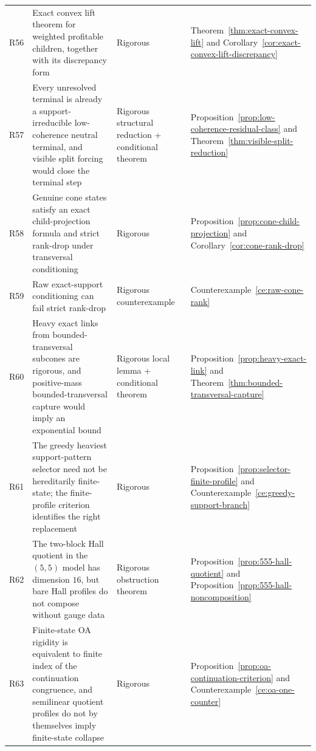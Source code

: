 \documentclass[11pt]{article}
\theoremstyle{definition}
\newcommand{\1}{\mathbf{1}}
\begin{document}
\begin{longtable}{p{}p{}p{}p{}}
R56 & Exact convex lift theorem for weighted profitable children, together with its discrepancy form & Rigorous & Theorem~\ref{thm:exact-convex-lift} and Corollary~\ref{cor:exact-convex-lift-discrepancy}\\
R57 & Every unresolved terminal is already a support-irreducible low-coherence neutral terminal, and visible split forcing would close the terminal step & Rigorous structural reduction + conditional theorem & Proposition~\ref{prop:low-coherence-residual-class} and Theorem~\ref{thm:visible-split-reduction}\\
R58 & Genuine cone states satisfy an exact child-projection formula and strict rank-drop under transversal conditioning & Rigorous & Proposition~\ref{prop:cone-child-projection} and Corollary~\ref{cor:cone-rank-drop}\\
R59 & Raw exact-support conditioning can fail strict rank-drop & Rigorous counterexample & Counterexample~\ref{ce:raw-cone-rank}\\
R60 & Heavy exact links from bounded-transversal subcones are rigorous, and positive-mass bounded-transversal capture would imply an exponential bound & Rigorous local lemma + conditional theorem & Proposition~\ref{prop:heavy-exact-link} and Theorem~\ref{thm:bounded-transversal-capture}\\
R61 & The greedy heaviest support-pattern selector need not be hereditarily finite-state; the finite-profile criterion identifies the right replacement & Rigorous & Proposition~\ref{prop:selector-finite-profile} and Counterexample~\ref{ce:greedy-support-branch}\\
R62 & The two-block Hall quotient in the $(5,5)$ model has dimension $16$, but bare Hall profiles do not compose without gauge data & Rigorous obstruction theorem & Proposition~\ref{prop:555-hall-quotient} and Proposition~\ref{prop:555-hall-noncomposition}\\
R63 & Finite-state OA rigidity is equivalent to finite index of the continuation congruence, and semilinear quotient profiles do not by themselves imply finite-state collapse & Rigorous & Proposition~\ref{prop:oa-continuation-criterion} and Counterexample~\ref{ce:oa-one-counter}\\


\end{longtable}
\end{document}
